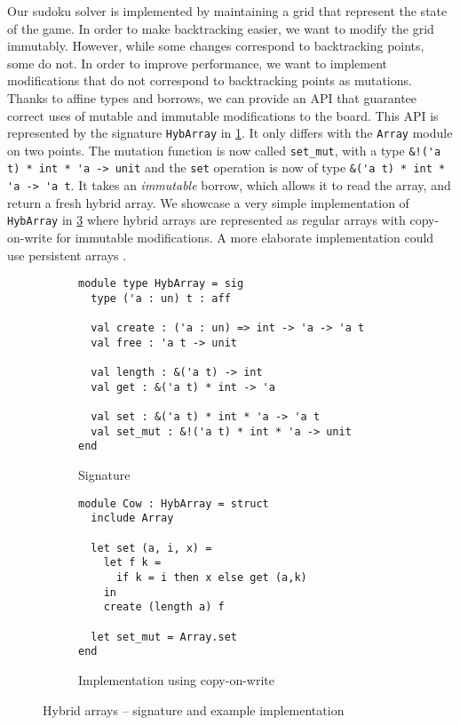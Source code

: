 Our sudoku solver is implemented by maintaining a grid that represent the state of the game. In order to make backtracking easier, we want to modify the grid immutably. However, while some changes correspond to backtracking points,
some do not.
In order to improve performance, we want to implement modifications
that do not correspond to backtracking points as mutations.
Thanks to affine types and borrows, we can provide an API that guarantee correct
uses of mutable and immutable modifications to the board.
This API is represented by the signature \lstinline/HybArray/ in \cref{sig:hybarray}.
It only differs with the \lstinline/Array/ module on two points.
The mutation function is now called \lstinline/set_mut/, with
a type \lstinline/&!('a t) * int * 'a -> unit/ and
the \lstinline/set/ operation
is now of type \lstinline/&('a t) * int * 'a -> 'a t/. It
takes an \emph{immutable} borrow, which allows it to read the array, and
return a fresh hybrid array.
We showcase a very simple implementation of \lstinline/HybArray/ in
\cref{ex:cow} where hybrid arrays are represented
as regular arrays with copy-on-write for immutable
modifications.
A more elaborate implementation could use persistent arrays
\cite{DBLP:conf/ml/ConchonF07}.


\begin{figure}
  \centering
  \begin{subfigure}{0.48\linewidth}
\begin{lstlisting}
module type HybArray = sig
  type ('a : un) t : aff
  
  val create : ('a : un) => int -> 'a -> 'a t
  val free : 'a t -> unit

  val length : &('a t) -> int
  val get : &('a t) * int -> 'a

  val set : &('a t) * int * 'a -> 'a t
  val set_mut : &!('a t) * int * 'a -> unit
end
\end{lstlisting}
    \caption{Signature}
    \label{sig:hybarray}
  \end{subfigure}\hfill
  \begin{subfigure}{0.5\linewidth}
\begin{lstlisting}
module Cow : HybArray = struct
  include Array

  let set (a, i, x) =
    let f k =
      if k = i then x else get (a,k)
    in
    create (length a) f
  
  let set_mut = Array.set
end
\end{lstlisting}
    \caption{Implementation using copy-on-write}
    \label{ex:cow}
  \end{subfigure}
  \caption{Hybrid arrays -- signature and example implementation}
\end{figure}



